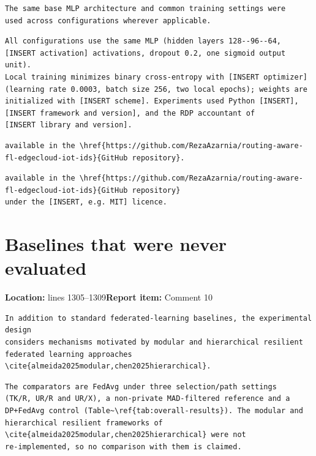 \documentclass[10pt,a4paper]{article}
\newcommand{\issue}[3]{\section{#1}{\raggedright\noindent\textcolor{note}{\small\textbf{Location:} #2\quad\textbf{Report item:} #3}\par}\smallskip}
\begin{document}
\begin{before}[lines 1405--1406]
\begin{Verbatim}
The same base MLP architecture and common training settings were
used across configurations wherever applicable.
\end{Verbatim}
\end{before}

\begin{after}
\begin{Verbatim}
All configurations use the same MLP (hidden layers 128--96--64,
[INSERT activation] activations, dropout 0.2, one sigmoid output unit).
Local training minimizes binary cross-entropy with [INSERT optimizer]
(learning rate 0.0003, batch size 256, two local epochs); weights are
initialized with [INSERT scheme]. Experiments used Python [INSERT],
[INSERT framework and version], and the RDP accountant of
[INSERT library and version].
\end{Verbatim}
\end{after}

\begin{before}
\begin{Verbatim}
available in the \href{https://github.com/RezaAzarnia/routing-aware-fl-edgecloud-iot-ids}{GitHub repository}.
\end{Verbatim}
\end{before}

\begin{after}
\begin{Verbatim}
available in the \href{https://github.com/RezaAzarnia/routing-aware-fl-edgecloud-iot-ids}{GitHub repository}
under the [INSERT, e.g. MIT] licence.
\end{Verbatim}
\end{after}

\issue{Baselines that were never evaluated}{lines 1305--1309}{Comment 10}

\begin{before}[lines 1305--1309]
\begin{Verbatim}
In addition to standard federated-learning baselines, the experimental design
considers mechanisms motivated by modular and hierarchical resilient
federated learning approaches
\cite{almeida2025modular,chen2025hierarchical}.
\end{Verbatim}
\end{before}

\begin{after}
\begin{Verbatim}
The comparators are FedAvg under three selection/path settings
(TK/R, UR/R and UR/X), a non-private MAD-filtered reference and a
DP+FedAvg control (Table~\ref{tab:overall-results}). The modular and
hierarchical resilient frameworks of
\cite{almeida2025modular,chen2025hierarchical} were not
re-implemented, so no comparison with them is claimed.
\end{Verbatim}
\end{after}
\end{document}
